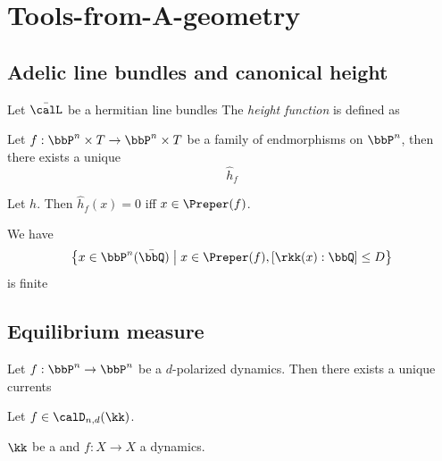 \section{Tools-from-A-geometry}

\subsection[status=draft,tag=0000000,label=\labelNFM{subsec:on-complex-dynamics}]{Adelic line bundles and canonical height}

\begin{definition}[label=\labelNFM{def:height-function-by-metrized-line-bundle}, status=draft, tag=0000000]
	Let $\bar{\calL}$ be a hermitian line bundles
	The \emph{height function} is defined as
	\Yang{}
\end{definition}

\begin{proposition}[label=\labelNFM{prop:canonical-height-for-family-of-endomorphism-on-pn}, status=draft, tag=0000000]
	Let $f: \bbP^n \times T \to \bbP^n \times T$ be a family of endmorphisms on $\bbP^n$, then there exists a unique
	\[ \hat{h}_f \]
	\Yang{}
\end{proposition}

\begin{corollary}[label=\labelNFM{cor:zero-of-canonical-height-was-preperiodic-points}, status=draft, tag=0000000]
	Let $h$.
	Then $\hat{h}_f(x) = 0$ iff $x \in \Preper(f)$.
\end{corollary}

\begin{corollary}[label=\labelNFM{cor:finiteness-of-preperiodic-points-of-finite-degree-defined-field}, status=draft, tag=0000000]
	We have
	\[ \left\{ x \in \bbP^n(\bar{\bbQ}) \;\middle|\; x \in \Preper(f), [\rkk(x): \bbQ] \leq D \right\} \]
	is finite \Yang{}
\end{corollary}



\subsection[status=draft,tag=0000000,label=\labelNFM{subsec:equilibrium-measure-and-julia-sets}]{Equilibrium measure}

\begin{lemma}[label=\labelNFM{lem:existence-of-green-currents-and-functions-for-dynamics-on-pn}, status=draft, tag=0000000]
	Let $f: \bbP^n \to \bbP^n$ be a $d$-polarized dynamics.
	Then there exists a unique currents \Yang{}
\end{lemma}


\begin{definition}[label=\labelNFM{def:equilibrium-measure}, status=draft, tag=0000000]
	Let $f \in \calD_{n,d}(\kk)$.

	$\kk$ be a and $f:X \to X$ a dynamics.
	\Yang{}
\end{definition}







